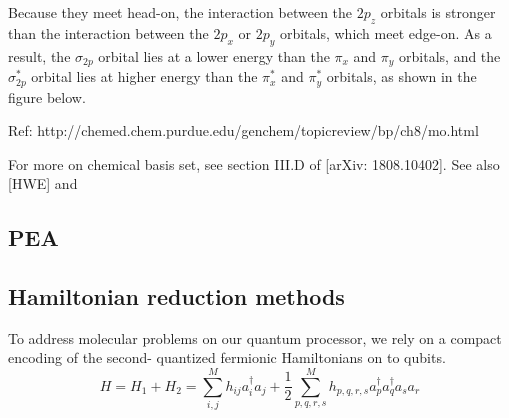 \documentclass[11pt, oneside]{article}   	%
\begin{document}
Because they meet head-on, the interaction between the $2p_z$ orbitals is stronger than the interaction between the $2p_x$ or $2p_y$ orbitals, which meet edge-on. 
As a result, the $\sigma_{2p}$ orbital lies at a lower energy than the $\pi_x$ and $\pi_y$ orbitals, and the $\sigma^*_{2p}$ orbital lies at higher energy than the $\pi^*_{x}$ and $\pi^*_{y}$ orbitals, as shown in the figure below.

Ref: 
http://chemed.chem.purdue.edu/genchem/topicreview/bp/ch8/mo.html

For more on chemical basis set, see section III.D of [arXiv: 1808.10402].
See also [HWE] and 

\subsection{PEA}
\subsection{Hamiltonian reduction methods}
To address molecular problems on our quantum processor, we rely on a compact encoding of the second- quantized fermionic Hamiltonians on to qubits. 
\begin{equation}
H = H_1 + H_2 = \sum^M_{i,j} h_{ij} a^{\dagger}_i a_j + \frac{1}{2} \sum^M_{p, q, r, s} h_{p, q, r, s} a^{\dagger}_p a^{\dagger}_q a_s a_r
\end{equation}
\end{document}
